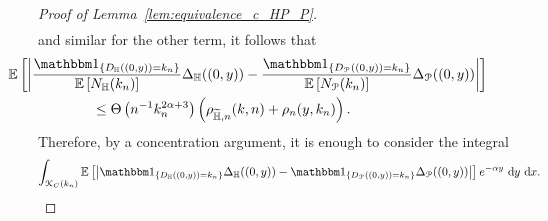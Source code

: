 \begin{proof}[Proof of Lemma~\ref{lem:equivalence_c_HP_P}]
\begin{align*}
\end{align*}
and similar for the other term, it follows that
\begin{align*}
	&\hspace{-60pt}\Exp{ \left| \frac{\ind{D_\H((0,y)) = k_n}}{\Exp{N_\H(k_n)}} \Delta_\H ((0,y) )
		- \frac{\ind{D_\Pcal((0,y)) = k_n}}{\Exp{N_\Pcal(k_n)}}  \Delta_\Pcal ((0,y))\right|} \\
	&\le \bigT{n^{-1} k_n^{2\alpha + 3}}\left(\rho_{\HP,n}(k,n) + \rho_n(y,k_n)\right).
\end{align*}
Therefore, by a concentration argument, it is enough to consider the integral
\begin{equation} \label{eq:expectation_total}
	\int_{\Kcal_{C}(k_n)} \Exp{\left|\ind{D_\H((0,y)) = k_n} \Delta_\H ((0,y) ) 
		- \ind{D_\Pcal((0,y)) = k_n} \Delta_\Pcal ((0,y))\right|} e^{-\alpha y} \dd y \dd x.
\end{equation}


\end{proof}
